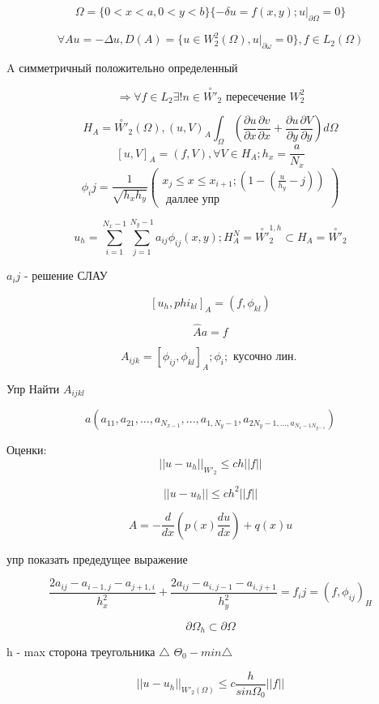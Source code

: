 \documentclass[12pt, a4paper]{article}
\begin{document}
\[ \Omega = \{0 < x < a, 0 < y < b\} \{- \delta u = f(x, y); u|_{\partial \Omega} = 0 \} \]

\[ \forall A u = - \Delta u , D(A) = \{u \in W_2^2(\Omega) , u|_{\partial \omega} = 0 \}, f \in L_2(\Omega) \]

A симметричный положительно определенный

\[ \Rightarrow \forall f \in L_2 \exists ! n \in \overset{\circ}{W'}_2 \textrm{ пересечение } W_2^2 \]

\[ H_A = \overset{\circ}{W'}_2 (\Omega), {(u, V)}_A \int_{\Omega}^{} (\frac{\partial u}{\partial x}\frac{\partial v}{\partial x}+\frac{\partial u}{\partial y}\frac{\partial V}{\partial y})d\Omega\]
\[ {[u, V]}_A = (f, V), \forall V \in H_A; h_x = \frac{a}{N_x} \]
\[
\phi_ij = \frac{1}{\sqrt{h_x h_y}}
\left(
    \begin{array}{c}
        x_j \leq x \leq x_{i+1}; (1 - (\frac{u}{h_y}-j)) \\
        \textrm{ даллее упр }
    \end{array}
\right)
\]

\[ u_h = \sum_{i=1}^{N_x -1} \sum_{j=1}^{N_y - 1} a_{ij} \phi_{ij} (x, y); H_A^N = \overset{\circ}{W'}_2^{1, h} \subset H_A = \overset{\circ}{W'}_2 \]

$ a_ij $ - решение СЛАУ

\[ {[u_h, phi_{kl}]}_A = (f, \phi_{kl}) \]

\[ \hat{A} a = f \]

\[ A_{ijk} = {[\phi_{ij}, \phi_{kl}]}_A; \phi_i; \textrm{ кусочно лин. } \]

Упр Найти $ A_{ijkl} $

\[ a (a_{11}, a_{21}, ... , a_{N_{x-1}}, ... , a_{1, N_y-1}, a_{2 N_y-1, ... , a_{N_x-1 N_{y-1}}}) \]

Оценки:
\[ {||u - u_h||}_{{W'}_2} \leq ch ||f|| \]

\[ ||u - u_h|| \leq ch^2 ||f|| \]

\[ A = - \frac{d}{dx} (p(x) \frac{du}{dx}) + q(x)u \]

упр показать предедущее выражение

\[ \frac{2a_{ij} - a_{i-1, j} - a_{j+1, i}}{h^2_x} + \frac{2a_{ij} - a_{i, j-1} - a_{i, j+1}}{h^2_y} = f_ij = {(f, \phi_{ij})}_H \]

\[ \partial  \Omega_h \subset \partial  \Omega \]

h - max сторона треугольника $ \triangle $
$\Theta_0 - min \triangle $

\[ {||u-u_h||}_{{W'}_2(\Omega)} \leq c \frac{h}{sin \Omega_0} ||f|| \]
\end{document}
